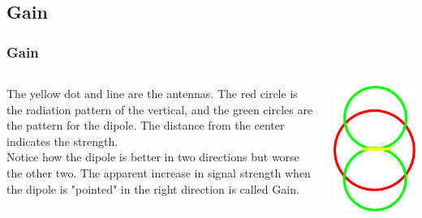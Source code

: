 \documentclass[10pt]{beamer}
\begin{document}
\subsection{Gain}
\begin{frame}
\frametitle{Gain}
\begin{columns}
\begin{column}{.5\textwidth}
The yellow dot and line are the antennas. The red circle is the radiation pattern of the vertical, and the green circles are the pattern for the dipole. The distance from the center indicates the strength.\\
Notice how the dipole is better in two directions but worse the other two. The apparent increase in signal strength when the dipole is "pointed" in the right direction is called Gain.
\end{column}
\begin{column}{.5\textwidth}
\includegraphics[width=\textwidth]{vertvsdipole.png}
\end{column}
\end{columns}
\end{frame}
\end{document}
